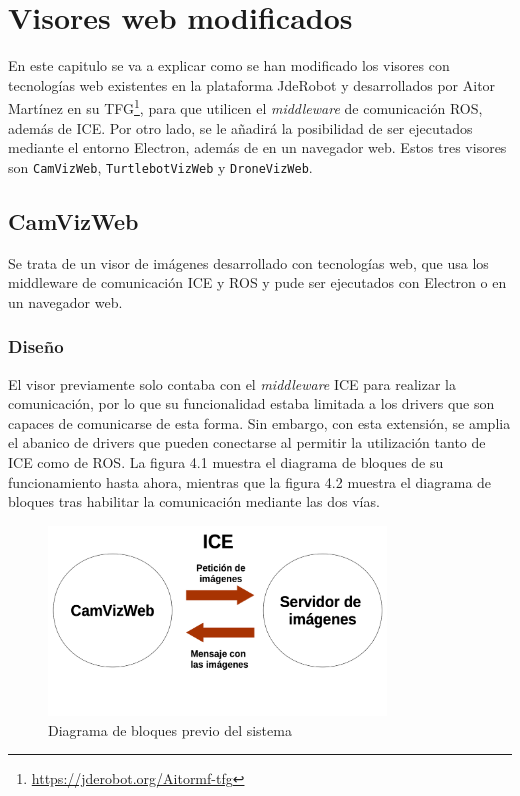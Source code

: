 \chapter{Visores web modificados}\label{cap.Visores}
En este capitulo se va a explicar como se han modificado los visores con tecnologías web existentes en la plataforma JdeRobot y desarrollados por Aitor Martínez en su TFG\footnote{\url{https://jderobot.org/Aitormf-tfg}}, para que utilicen el \textit{middleware} de comunicación ROS, además de ICE. Por otro lado, se le añadirá la posibilidad de ser ejecutados mediante el entorno Electron, además de en un navegador web. Estos tres visores son \texttt{CamVizWeb}, \texttt{TurtlebotVizWeb} y \texttt{DroneVizWeb}.

\section{CamVizWeb}
Se trata de un visor de imágenes desarrollado con tecnologías web, que usa los middleware de comunicación ICE y ROS  y pude ser ejecutados con Electron o en un navegador web.

\subsection{Diseño}
El visor previamente solo contaba con el \textit{middleware} ICE para realizar la comunicación, por lo que su funcionalidad estaba limitada a los drivers que son capaces de comunicarse de esta forma. Sin embargo, con esta extensión, se amplia el abanico de drivers que pueden conectarse al permitir la utilización tanto de ICE como de ROS. La figura 4.1 muestra el diagrama de bloques de su funcionamiento hasta ahora, mientras que la figura 4.2 muestra el diagrama de bloques tras habilitar la comunicación mediante las dos vías.

\begin{figure}[H]
  \begin{center}
    \includegraphics[width=0.8\textwidth]{figures/esquemacamviz1.png}
		\caption{Diagrama de bloques previo del sistema}
		\label{fig.esquemacamviz1}
		\end{center}
\end{figure}

